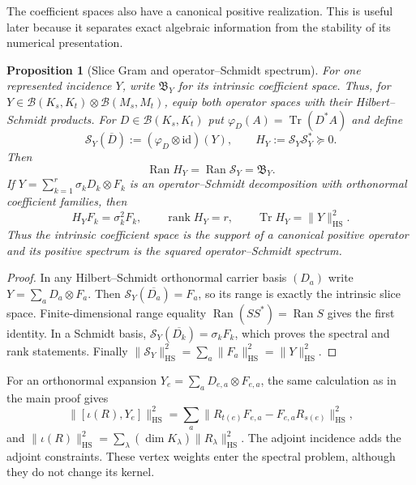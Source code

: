 \documentclass[11pt]{article}
\numberwithin{equation}{section}
\newtheorem{proposition}[theorem]{Proposition}
\theoremstyle{definition}
\theoremstyle{remark}
\newcommand{\id}{\mathrm{id}}
\newcommand{\Tr}{\operatorname{Tr}}
\newcommand{\rank}{\operatorname{rank}}
\newcommand{\Ran}{\operatorname{Ran}}
\newcommand{\HS}{\mathrm{HS}}
\newcommand{\norm}[1]{\lVert#1\rVert}
\begin{document}
The coefficient spaces also have a canonical positive realization.  This is
useful later because it separates exact algebraic information from the
stability of its numerical presentation.

\begin{proposition}[Slice Gram and operator--Schmidt spectrum]
\label{prop:incidence-slice-Gram}
For one represented incidence $Y$, write $\mathfrak B_Y$ for its intrinsic coefficient space.  Thus, for
$Y\in\mathcal B(K_s,K_t)\otimes\mathcal B(M_s,M_t)$, equip both operator
spaces with their Hilbert--Schmidt products.  For
$D\in\mathcal B(K_s,K_t)$ put
$\varphi_D(A)=\Tr(D^*A)$ and define
\[
 \mathcal S_Y(\overline D):=(\varphi_D\otimes\id)(Y),
 \qquad
 H_Y:=\mathcal S_Y\mathcal S_Y^*\succeq0.
\]
Then
\begin{equation}
 \Ran H_Y=\Ran\mathcal S_Y=\mathfrak B_Y.
 \label{eq:incidence-slice-Gram-range}
\end{equation}
If
$Y=\sum_{k=1}^r\sigma_kD_k\otimes F_k$ is an operator--Schmidt decomposition
with orthonormal coefficient families, then
\begin{equation}
 H_YF_k=\sigma_k^2F_k,\qquad
 \rank H_Y=r,\qquad
 \Tr H_Y=\norm{Y}_{\HS}^2.
 \label{eq:incidence-slice-Gram-spectrum}
\end{equation}
Thus the intrinsic coefficient space is the support of a canonical positive
operator and its positive spectrum is the squared operator--Schmidt spectrum.
\end{proposition}

\begin{proof}
In any Hilbert--Schmidt orthonormal carrier basis $(D_a)$ write
$Y=\sum_aD_a\otimes F_a$.  Then
$\mathcal S_Y(\overline{D_a})=F_a$, so its range is exactly the intrinsic
slice space.  Finite-dimensional range equality
$\Ran(SS^*)=\Ran S$ gives the first identity.  In a Schmidt basis,
$\mathcal S_Y(\overline{D_k})=\sigma_kF_k$, which proves the spectral and
rank statements.  Finally
$\|\mathcal S_Y\|_{\HS}^2=\sum_a\|F_a\|_{\HS}^2=\|Y\|_{\HS}^2$.
\end{proof}

For an orthonormal expansion $Y_e=\sum_aD_{e,a}\otimes F_{e,a}$, the
same calculation as in the main proof gives
\begin{equation}
 \|[\iota(R),Y_e]\|_{\HS}^2
 =\sum_a\|R_{t(e)}F_{e,a}-F_{e,a}R_{s(e)}\|_{\HS}^2,
 \label{eq:coefficient-commutator-form}
\end{equation}
and $\|\iota(R)\|_{\HS}^2=
\sum_\lambda(\dim K_\lambda)\|R_\lambda\|_{\HS}^2$.
The adjoint incidence adds the adjoint constraints.  These vertex weights
enter the spectral problem, although they do not change its kernel.
\end{document}
